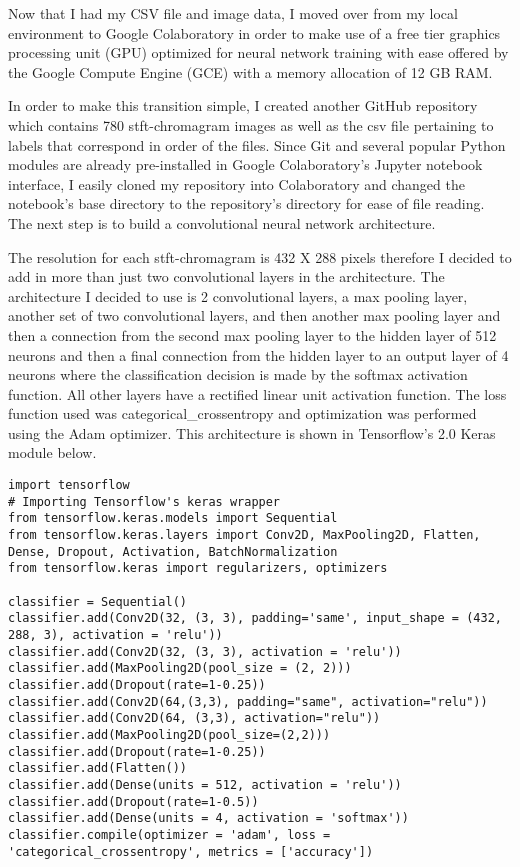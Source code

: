 Now that I had my CSV file and image data, I moved over from my local environment to Google Colaboratory in order to make use of a free tier graphics processing unit (GPU) optimized for neural network training with ease offered by the Google Compute Engine (GCE) with a memory allocation of 12 GB RAM.
\par
In order to make this transition simple, I created another GitHub repository which contains 780 stft-chromagram images as well as the csv file pertaining to labels that correspond in order of the files. Since Git and several popular Python modules are already pre-installed in Google Colaboratory's Jupyter notebook interface, I easily cloned my repository into Colaboratory and changed the notebook's base directory to the repository's directory for ease of file reading. The next step is to build a convolutional neural network architecture.
\par
The resolution for each stft-chromagram is 432 X 288 pixels therefore I decided to add in more than just two convolutional layers in the architecture. The architecture I decided to use is 2 convolutional layers, a max pooling layer, another set of two convolutional layers, and then another max pooling layer and then a connection from the second max pooling layer to the hidden layer of 512 neurons and then a final connection from the hidden layer to an output layer of 4 neurons where the classification decision is made by the softmax activation function. All other layers have a rectified linear unit activation function. The loss function used was categorical\_crossentropy and optimization was performed using the Adam optimizer. This architecture is shown in Tensorflow's 2.0 Keras module below.

\begin{lstlisting}
import tensorflow
# Importing Tensorflow's keras wrapper
from tensorflow.keras.models import Sequential
from tensorflow.keras.layers import Conv2D, MaxPooling2D, Flatten, Dense, Dropout, Activation, BatchNormalization
from tensorflow.keras import regularizers, optimizers

classifier = Sequential()
classifier.add(Conv2D(32, (3, 3), padding='same', input_shape = (432, 288, 3), activation = 'relu'))
classifier.add(Conv2D(32, (3, 3), activation = 'relu'))
classifier.add(MaxPooling2D(pool_size = (2, 2)))
classifier.add(Dropout(rate=1-0.25))
classifier.add(Conv2D(64,(3,3), padding="same", activation="relu"))
classifier.add(Conv2D(64, (3,3), activation="relu"))
classifier.add(MaxPooling2D(pool_size=(2,2)))
classifier.add(Dropout(rate=1-0.25))
classifier.add(Flatten())
classifier.add(Dense(units = 512, activation = 'relu'))
classifier.add(Dropout(rate=1-0.5))
classifier.add(Dense(units = 4, activation = 'softmax'))
classifier.compile(optimizer = 'adam', loss = 'categorical_crossentropy', metrics = ['accuracy'])
\end{lstlisting}

